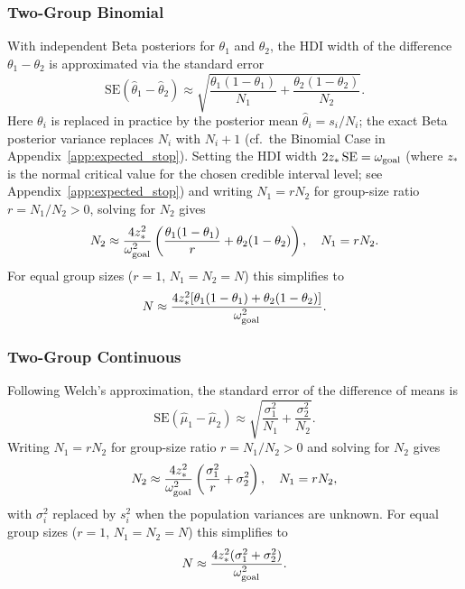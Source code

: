 \subsubsection*{Two-Group Binomial}

With independent Beta posteriors for $\theta_1$ and $\theta_2$, the HDI width of
the difference $\theta_1 - \theta_2$ is approximated via the standard error
\begin{equation}\label{eq:se_diff_binomial}
    \text{SE}(\hat\theta_1 - \hat\theta_2) \approx
    \sqrt{\frac{\theta_1(1-\theta_1)}{N_1} + \frac{\theta_2(1-\theta_2)}{N_2}}.
\end{equation}
Here $\theta_i$ is replaced in practice by the posterior mean $\hat\theta_i = s_i/N_i$;
the exact Beta posterior variance replaces $N_i$ with $N_i+1$ (cf.\ the Binomial Case
in Appendix~\ref{app:expected_stop}).
Setting the HDI width $2z_*\,\text{SE} = \omega_{\rm goal}$ (where $z_*$ is the
normal critical value for the chosen credible interval level;
see Appendix~\ref{app:expected_stop}) and writing
$N_1 = rN_2$ for group-size ratio $r = N_1/N_2 > 0$, solving for $N_2$ gives
\begin{equation}\label{eq:ngoal_two_group_binomial}
    N_2 \approx \frac{4 z_{*}^{2}}{\omega_{\rm goal}^{2}}
        \left(\frac{\theta_1(1-\theta_1)}{r} + \theta_2(1-\theta_2)\right),
    \quad N_1 = r N_2.
\end{equation}
For equal group sizes ($r=1$, $N_1=N_2=N$) this simplifies to
\begin{equation}\label{eq:ngoal_two_group_binomial_equal}
    N \approx \frac{4 z_{*}^{2}[\theta_1(1-\theta_1)+\theta_2(1-\theta_2)]}{\omega_{\rm goal}^{2}}.
\end{equation}

\subsubsection*{Two-Group Continuous}

Following Welch's approximation, the standard error of the difference of means is
\begin{equation}\label{eq:se_diff_continuous}
    \text{SE}(\hat\mu_1 - \hat\mu_2) \approx
    \sqrt{\frac{\sigma_1^2}{N_1} + \frac{\sigma_2^2}{N_2}}.
\end{equation}
Writing $N_1 = rN_2$ for group-size ratio $r = N_1/N_2 > 0$ and solving for $N_2$ gives
\begin{equation}\label{eq:ngoal_two_group_continuous}
    N_2 \approx \frac{4 z_{*}^{2}}{\omega_{\rm goal}^{2}}
        \left(\frac{\sigma_1^2}{r} + \sigma_2^2\right),
    \quad N_1 = r N_2,
\end{equation}
with $\sigma_i^2$ replaced by $s_i^2$ when the population variances are unknown.
For equal group sizes ($r=1$, $N_1=N_2=N$) this simplifies to
\begin{equation}\label{eq:ngoal_two_group_continuous_equal}
    N \approx \frac{4 z_{*}^{2}(\sigma_1^2+\sigma_2^2)}{\omega_{\rm goal}^{2}}.
\end{equation}
